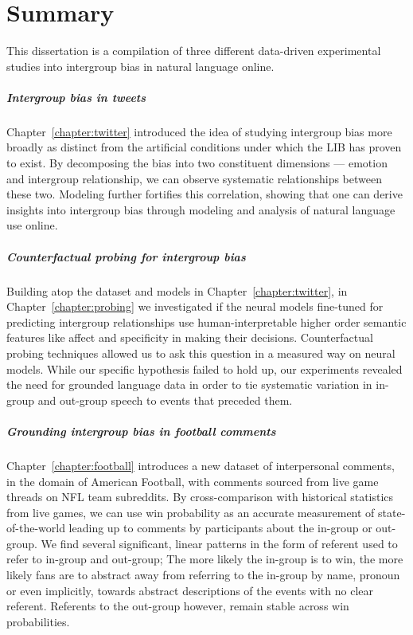 \chapter{Summary}
\label{chapter:summary}

This dissertation is a compilation of three different data-driven experimental studies into intergroup bias in natural language online.

\paragraph{Intergroup bias in tweets} Chapter~\ref{chapter:twitter} introduced the idea of studying intergroup bias more broadly as distinct from the artificial conditions under which the LIB has proven to exist. By decomposing the bias into two constituent dimensions --- emotion and intergroup relationship, we can observe systematic relationships between these two. Modeling further fortifies this correlation, showing that one can derive insights into intergroup bias through modeling and analysis of natural language use online.

\paragraph{Counterfactual probing for intergroup bias} Building atop the dataset and models in Chapter~\ref{chapter:twitter}, in Chapter~\ref{chapter:probing} we investigated if the neural models fine-tuned for predicting intergroup relationships use human-interpretable higher order semantic features like affect and specificity in making their decisions. Counterfactual probing techniques allowed us to ask this question in a measured way on neural models. While our specific hypothesis failed to hold up, our experiments revealed the need for grounded language data in order to tie systematic variation in in-group and out-group speech to events that preceded them.

\paragraph{Grounding intergroup bias in football comments} Chapter~\ref{chapter:football} introduces a new dataset of interpersonal comments, in the domain of American Football, with comments sourced from live game threads on NFL team subreddits. By cross-comparison with historical statistics from live games, we can use win probability as an accurate measurement of state-of-the-world leading up to comments by participants about the in-group or out-group. We find several significant, linear patterns in the form of referent used to refer to in-group and out-group; The more likely the in-group is to win, the more likely fans are to abstract away from referring to the in-group by name, pronoun or even implicitly, towards abstract descriptions of the events with no clear referent. Referents to the out-group however, remain stable across win probabilities. 

